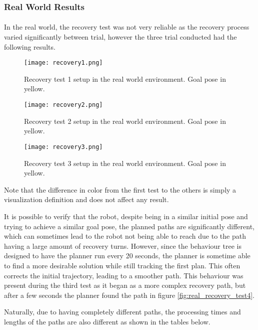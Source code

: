 \clearpage

\subsubsection{Real World Results}

\paragraph{}In the real world, the recovery test was not very reliable as the recovery 
process varied significantly between trial, however the three trial conducted had the 
following results.
\begin{figure}[h]
    \centering
    \texttt{[image: recovery1.png]}
    \caption{Recovery test 1 setup in the real world environment. Goal pose in yellow.}
    \label{fig:real_recovery_test1}
\end{figure}
\begin{figure}[h]
    \centering
    \texttt{[image: recovery2.png]}
    \caption{Recovery test 2 setup in the real world environment. Goal pose in yellow.}
    \label{fig:real_recovery_test2}
\end{figure}
\clearpage
\begin{figure}[h]
    \centering
    \texttt{[image: recovery3.png]}
    \caption{Recovery test 3 setup in the real world environment. Goal pose in yellow.}
    \label{fig:real_recovery_test3}
\end{figure}

Note that the difference in color from the first test to the others is simply a 
visualization definition and does not affect any result.

It is possible to verify that the robot, despite being in a similar initial pose 
and trying to achieve a similar goal pose, the planned paths are significantly different, which 
can sometimes lead to the robot not being able to reach due to the path 
having a large amount of recovery turns. However, since the behaviour tree is 
designed to have the planner run every 20 seconds, the planner is sometime able to 
find a more desirable solution while still tracking the first plan. This often 
corrects the initial trajectory, leading to a smoother path. This behaviour was present 
during the third test as it began as a more complex recovery path, but after 
a few seconds the planner found the path in figure \ref{fig:real_recovery_test4}.

Naturally, due to having completely different paths, the processing times and 
lengths of the paths are also different as shown in the tables below.

